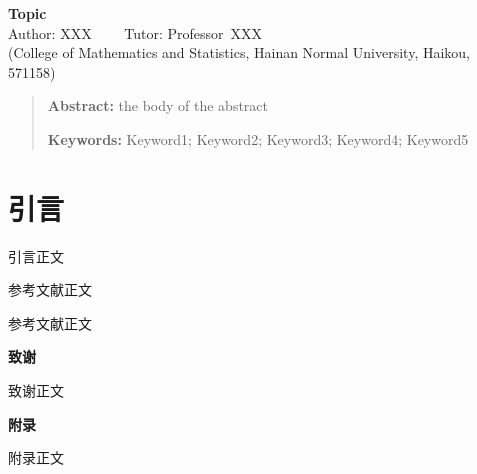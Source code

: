 \documentclass[11pt,a4paper]{article}
\begin{document}
\begin{center}
		\Large{\textbf {Topic} }%
		\\
		\large{ Author: XXX ~~~~Tutor: Professor~XXX  %
			\\
			(College of Mathematics and Statistics, Hainan Normal University, Haikou, 571158)}
\end{center}
\renewcommand\baselinestretch{1.4}\selectfont
\begin{quotation} \textbf{Abstract:}
		the body of the abstract
		
	\textbf{Keywords:} Keyword1; Keyword2; Keyword3; Keyword4; Keyword5
\end{quotation}\par

\newpage
{}
\section{引言}

引言正文


\renewcommand\baselinestretch{1.1}\selectfont
\renewcommand\refname{\textbf{参考文献}}
\begin{thebibliography}{1}
	\fangsong
	
	参考文献正文
	
	参考文献正文
	
\end{thebibliography}


\renewcommand\baselinestretch{1.4}\selectfont
{}
\begin{flushleft}
	\textbf{致谢}
\end{flushleft}

致谢正文


\begin{flushleft}
	\textbf{附录}
\end{flushleft}

附录正文
\end{document}
